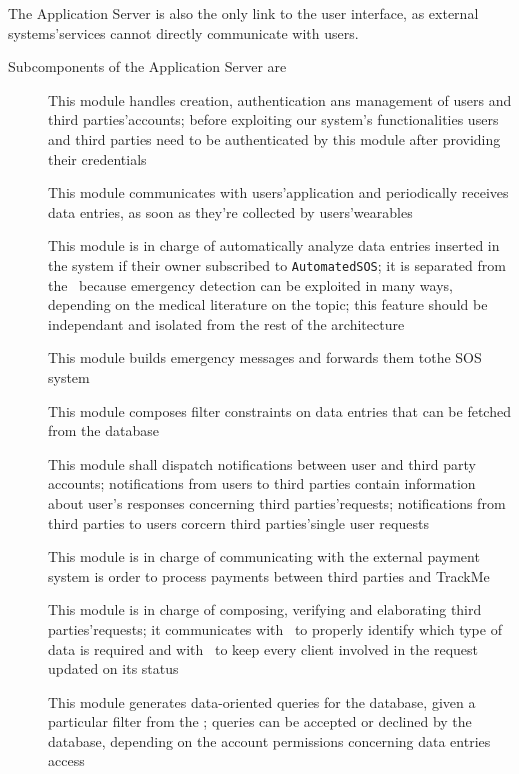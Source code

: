 \documentclass[../DD0.tex]{subfiles}
\begin{document}
        The Application Server is also the only link to the user interface, as external systems'services cannot directly communicate with users.

        Subcomponents of the Application Server are
        \begin{description}
          \item[\AccountManager] This module handles creation, authentication ans management of users and third parties'accounts; before exploiting our system's functionalities users and third parties need to be authenticated by this module after providing their credentials
          \item[\DataCollector] This module communicates with users'application and periodically receives data entries, as soon as they're collected by users'wearables
          \item[\EmergencyDetector] This module is in charge of automatically analyze data entries inserted in the system if their owner subscribed to \texttt{AutomatedSOS}; it is separated from the \DataCollector\ because emergency detection can be exploited in many ways, depending on the medical literature on the topic; this feature should be independant and isolated from the rest of the architecture
          \item[\EmergencyDispatcher] This module builds emergency messages and forwards them tothe SOS system
          \item[\FilterManager] This module composes filter constraints on data entries that can be fetched from the database
          \item[\NotificationManager] This module shall dispatch notifications between user and third party accounts; notifications from users to third parties contain information about user's responses concerning third parties'requests; notifications from third parties to users corcern third parties'single user requests
          \item[\PaymentGateway] This module is in charge of communicating with the external payment system is order to process payments between third parties and TrackMe
          \item[\RequestManager] This module is in charge of composing, verifying and elaborating third parties'requests; it communicates with \FilterManager\ to properly identify which type of data is required and with \NotificationManager\ to keep every client involved in the request updated on its status
          \item[\SetBuilder] This module generates data-oriented queries for the database, given a particular filter from the \FilterManager; queries can be accepted or declined by the database, depending on the account permissions concerning data entries access
        \end{description}
\end{document}
